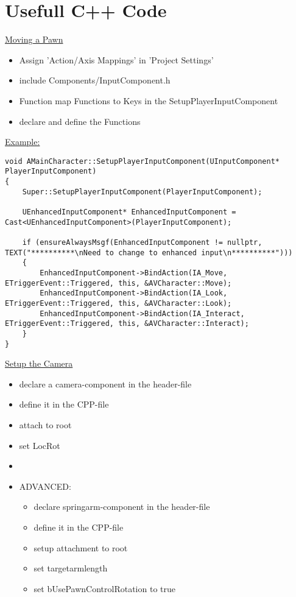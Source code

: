     \section{Usefull C++ Code}
        \uline{Moving a Pawn}
            \begin{itemize}
            \item Assign 'Action/Axis Mappings' in 'Project Settings'
                \item include Components/InputComponent.h
                \item Function map Functions to Keys in the SetupPlayerInputComponent 
                \item declare and define the Functions
            \end{itemize}
            \uline{Example:}
\begin{lstlisting}
void AMainCharacter::SetupPlayerInputComponent(UInputComponent* PlayerInputComponent)
{
    Super::SetupPlayerInputComponent(PlayerInputComponent);

    UEnhancedInputComponent* EnhancedInputComponent = Cast<UEnhancedInputComponent>(PlayerInputComponent);

    if (ensureAlwaysMsgf(EnhancedInputComponent != nullptr, TEXT("**********\nNeed to change to enhanced input\n**********")))
    {
        EnhancedInputComponent->BindAction(IA_Move, ETriggerEvent::Triggered, this, &AVCharacter::Move);
        EnhancedInputComponent->BindAction(IA_Look, ETriggerEvent::Triggered, this, &AVCharacter::Look);
        EnhancedInputComponent->BindAction(IA_Interact, ETriggerEvent::Triggered, this, &AVCharacter::Interact);
    }
}           
\end{lstlisting}

        \uline{Setup the Camera}
            \begin{itemize}
                \item declare a camera-component in the header-file
                \item define it in the CPP-file
                \item attach to root
                \item set LocRot
                \item 
                \item ADVANCED:
                \begin{itemize}
                    \item declare springarm-component in the header-file
                    \item define it in the CPP-file
                    \item setup attachment to root
                    \item set targetarmlength
                    \item set bUsePawnControlRotation to true
                \end{itemize}
            \end{itemize}

